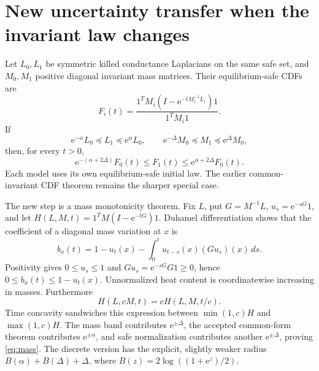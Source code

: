\documentclass[11pt]{article}
\newcommand{\ee}{\mathrm e}
\begin{document}
\section{New uncertainty transfer when the invariant law changes}
Let \(L_0,L_1\) be symmetric killed conductance Laplacians on the same safe set, and \(M_0,M_1\) positive diagonal invariant mass matrices. Their equilibrium-safe CDFs are
\[
 F_i(t)=\frac{1^TM_i(I-\ee^{-tM_i^{-1}L_i})1}{1^TM_i1}.
\]
If
\[
 \ee^{-\alpha}L_0\preceq L_1\preceq\ee^\alpha L_0,
 \qquad\ee^{-\Delta}M_0\preceq M_1\preceq\ee^\Delta M_0,
\]
then, for every \(t>0\),
\begin{equation}
 \boxed{\ee^{-(\alpha+2\Delta)}F_0(t)
 \le F_1(t)\le\ee^{\alpha+2\Delta}F_0(t).}
 \label{eq:mass}
\end{equation}
Each model uses its own equilibrium-safe initial law. The earlier common-invariant CDF theorem remains the sharper special case.

The new step is a mass monotonicity theorem. Fix \(L\), put \(G=M^{-1}L\), \(u_s=\ee^{-sG}1\), and let
\(H(L,M,t)=1^TM(I-\ee^{-tG})1\). Duhamel differentiation shows that the coefficient of a diagonal mass variation at \(x\) is
\[
 b_x(t)=1-u_t(x)-\int_0^t u_{t-s}(x)(Gu_s)(x)\,ds.
\]
Positivity gives \(0\le u_s\le1\) and \(Gu_s=\ee^{-sG}G1\ge0\), hence \(0\le b_x(t)\le1-u_t(x)\). Unnormalized heat content is coordinatewise increasing in masses. Furthermore
\[
 H(L,cM,t)=cH(L,M,t/c).
\]
Time concavity sandwiches this expression between \(\min(1,c)H\) and \(\max(1,c)H\). The mass band contributes \(\ee^{\pm\Delta}\), the accepted common-form theorem contributes \(\ee^{\pm\alpha}\), and safe normalization contributes another \(\ee^{\pm\Delta}\), proving \eqref{eq:mass}. The discrete version has the explicit, slightly weaker radius
\(B(\alpha)+B(\Delta)+\Delta\), where \(B(z)=2\log((1+\ee^z)/2)\).
\end{document}
